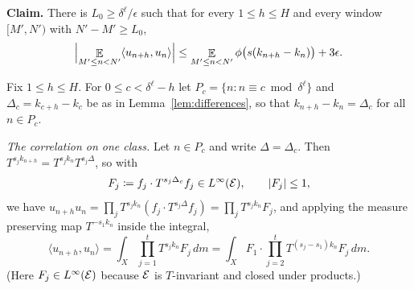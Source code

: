 \noindent\textbf{Claim.}  There is $L_0 \geq \delta^{\ell}/\epsilon$ such that for every $1 \leq h \leq H$ and every
  window $[M',N')$ with $N' - M' \geq L_0$,
  \begin{equation}
    \label{eq:per-shift}
    \Bigl\lvert \mathop{\mathbb{E}}_{M' \leq n < N'} \langle u_{n+h}, u_n \rangle \Bigr\rvert
      \leq \mathop{\mathbb{E}}_{M' \leq n < N'} \phi\bigl( s(k_{n+h}-k_n) \bigr) + 3\epsilon .
  \end{equation}

Fix $1 \leq h \leq H$.  For $0 \leq c < \delta^{\ell} - h$ let
$P_c = \{n : n \equiv c \bmod \delta^{\ell}\}$ and $\Delta_c = k_{c+h} - k_c$ be as in
Lemma~\ref{lem:differences}, so that $k_{n+h} - k_n = \Delta_c$ for all $n \in P_c$.

\emph{The correlation on one class.}  Let $n \in P_c$ and write $\Delta = \Delta_c$.  Then
$T^{s_j k_{n+h}} = T^{s_j k_n} T^{s_j\Delta}$, so with
\begin{equation}
  \label{eq:Fj}
  F_j \coloneqq f_j \cdot T^{s_j\Delta_c} f_j \in L^{\infty}(\mathcal{E}) , \qquad \lvert F_j \rvert \leq 1 ,
\end{equation}
we have $u_{n+h} u_n = \prod_j T^{s_jk_n}(f_j \cdot T^{s_j\Delta}f_j) = \prod_j T^{s_jk_n}F_j$,
and applying the measure preserving map $T^{-s_1k_n}$ inside the integral,
\begin{equation}
  \label{eq:two-inner}
  \langle u_{n+h}, u_n \rangle = \int_X \prod_{j=1}^{t} T^{s_j k_n} F_j \, dm
    = \int_X F_1 \cdot \prod_{j=2}^{t} T^{(s_j - s_1)k_n} F_j \, dm .
\end{equation}
(Here $F_j \in L^{\infty}(\mathcal{E})$ because $\mathcal{E}$ is $T$-invariant and closed under products.)

